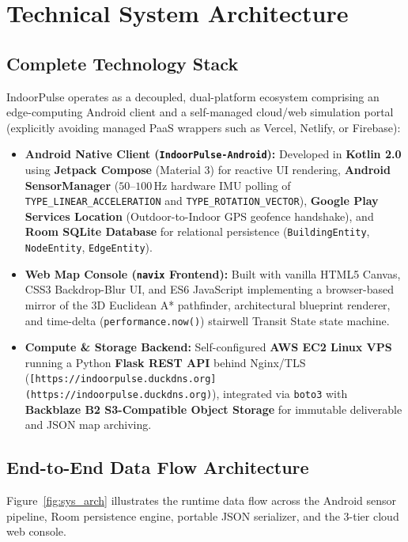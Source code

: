 \documentclass[11pt,a4paper]{article}
\begin{document}
\section{Technical System Architecture}

\subsection{Complete Technology Stack}
IndoorPulse operates as a decoupled, dual-platform ecosystem comprising an edge-computing Android client and a self-managed cloud/web simulation portal (explicitly avoiding managed PaaS wrappers such as Vercel, Netlify, or Firebase):
\begin{itemize}
    \item \textbf{Android Native Client (\texttt{IndoorPulse-Android}):} Developed in \textbf{Kotlin 2.0} using \textbf{Jetpack Compose} (Material 3) for reactive UI rendering, \textbf{Android SensorManager} ($50\text{--}100\,\text{Hz}$ hardware IMU polling of \texttt{TYPE\_LINEAR\_ACCELERATION} and \texttt{TYPE\_ROTATION\_VECTOR}), \textbf{Google Play Services Location} (Outdoor-to-Indoor GPS geofence handshake), and \textbf{Room SQLite Database} for relational persistence (\texttt{BuildingEntity}, \texttt{NodeEntity}, \texttt{EdgeEntity}).
    \item \textbf{Web Map Console (\texttt{navix} Frontend):} Built with vanilla HTML5 Canvas, CSS3 Backdrop-Blur UI, and ES6 JavaScript implementing a browser-based mirror of the 3D Euclidean A* pathfinder, architectural blueprint renderer, and time-delta (\texttt{performance.now()}) stairwell Transit State state machine.
    \item \textbf{Compute \& Storage Backend:} Self-configured \textbf{AWS EC2 Linux VPS} running a Python \textbf{Flask REST API} behind Nginx/TLS (\texttt{[https://indoorpulse.duckdns.org](https://indoorpulse.duckdns.org)}), integrated via \texttt{boto3} with \textbf{Backblaze B2 S3-Compatible Object Storage} for immutable deliverable and JSON map archiving.
\end{itemize}

\subsection{End-to-End Data Flow Architecture}
Figure~\ref{fig:sys_arch} illustrates the runtime data flow across the Android sensor pipeline, Room persistence engine, portable JSON serializer, and the 3-tier cloud web console.
\end{document}

